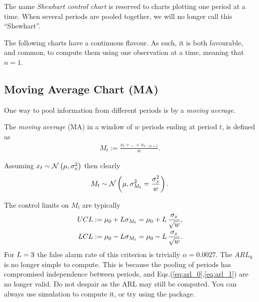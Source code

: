 \begin{remark}
The name \emph{Shewhart control chart} is reserved to charts plotting one period at a time. 
When several periods are pooled together, we will no longer call this  ``Shewhart''.
\end{remark}

\begin{remark}
The following charts have a continuous flavour. As such, it is both favourable, and common, to compute them using one observation at a time, meaning that $n=1$. 
\end{remark}





\subsection{Moving Average Chart (MA)}

One way to pool information from different periods is by a \emph{moving average}.
\begin{definition}[MA]
The \emph{moving average} (MA) in a window of $w$ periods ending at period $t$, is defined as
\begin{align}
	M_t:= \frac{x_t+\dots+x_{t-w+1}}{w}.
\end{align}
\end{definition}
Assuming $x_t \sim \mathcal{N}\left(\mu, \sigma_x^2\right)$ then clearly 
\begin{align}
	M_t \sim \mathcal{N}\left(\mu, \sigma^2_{M_t}=\frac{\sigma_x^2}{w}\right).
\end{align}

The control limits on $M_t$ are typically
\begin{align}
	UCL &:= \mu_0 + L \sigma_{M_t}= \mu_0 + L \, \frac{\sigma_x}{\sqrt{w}}, \\
	LCL &:= \mu_0 - L \sigma_{M_t}= \mu_0 - L \, \frac{\sigma_x}{\sqrt{w}}.
\end{align}
For $L=3$ the false alarm rate of this criterion is trivially $\alpha=0.0027$. 
The $ARL_0$ is no longer simple to compute. 
This is because the pooling of periods has compromised independence between periods, and Eqs.(\ref{eq:arl_0},\ref{eq:arl_1}) are no longer valid. 
Do not despair as the ARL may still be computed. 
You can always use simulation to compute it, or try using the  \R package.




